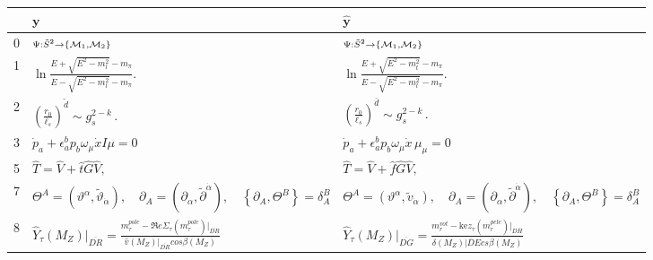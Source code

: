 \documentclass{article}
\begin{document}
\begin{figure*}
	\begin{tabular}{lll}
		& $\boldsymbol{y}$ & $\boldsymbol{\hat{y}}$ \\
		\hline
		\scriptsize{0} & $\scriptstyle{\Psi : \tilde { S } ^ { 2 } \to \{ { \cal M } _ { 1 } , { \cal M } _ { 2 } \} \, }$ & $\scriptstyle{\Psi : \tilde { S } ^ { 2 } \rightarrow \{ { \cal M } _ { 1 } , { \cal M } _ { 2 } \} }$ \\
\scriptsize{1} & $\scriptstyle{\operatorname { l n } { \frac { E + \sqrt { E ^ { 2 } - m _ { l } ^ { 2 } } - m _ { \pi } } { E - \sqrt { E ^ { 2 } - m _ { l } ^ { 2 } } - m _ { \pi } } } . }$ & $\scriptstyle{\operatorname { l n } { \frac { E + \sqrt { E ^ { 2 } - m _ { t } ^ { 2 } } - m _ { \pi } } { E - \sqrt { E ^ { 2 } - m _ { l } ^ { 2 } } - m _ { \pi } } } . }$ \\
\scriptsize{2} & $\scriptstyle{\left( { \frac { r _ { 0 } } { \ell _ { s } } } \right) ^ { \tilde { d } } \sim g _ { s } ^ { 2 - k } \, . }$ & $\scriptstyle{\left( \frac { r _ { 0 } } { \ell _ { s } } \right) ^ { \bar { d } } \sim g _ { s } ^ { 2 - k } \, . }$ \\
\scriptsize{3} & $\scriptstyle{\dot { p } _ { a } + \epsilon _ { a } ^ { b } p _ { b } \omega _ { \mu } \dot { x } I \mu = 0 }$ & $\scriptstyle{\dot { p } _ { a } + \epsilon _ { a } ^ { b } p _ { b } \omega _ { \mu } \dot { x } \, \mu _ { \mu } = 0 }$ \\
\scriptsize{5} & $\scriptstyle{{ \hat { T } } = { \hat { V } } + { \hat { t } } \hat { G } { \hat { V } } , }$ & $\scriptstyle{\hat { T } = \hat { V } + \hat { f } \hat { G } \hat { V } , }$ \\
\scriptsize{7} & $\scriptstyle{\Theta ^ { A } = \left( \vartheta ^ { \alpha } , \widetilde { \vartheta } _ { \dot { \alpha } } \right) , \quad \partial _ { A } = \left( \partial _ { \alpha } , \widetilde { \partial } ^ { \dot { \alpha } } \right) , \quad \left\{ \partial _ { A } , \Theta ^ { B } \right\} = \delta _ { A } ^ { B } }$ & $\scriptstyle{\Theta ^ { A } = \left( \vartheta ^ { \alpha } , \widetilde { v } _ { \dot { \alpha } } \right) , \quad \partial _ { A } = \left( \partial _ { \alpha } , \widetilde { \partial } ^ { \dot { \alpha } } \right) , \quad \left\{ \partial _ { A } , \Theta ^ { B } \right\} = \delta _ { A } ^ { B } }$ \\
\scriptsize{8} & $\scriptstyle{\hat { Y } _ { \tau } ( M _ { Z } ) | _ { \overline { { D R } } } = \frac { m _ { \tau } ^ { p o l e } - \Re e \Sigma _ { \tau } ( m _ { \tau } ^ { p o l e } ) | _ { \overline { { D R } } } } { \hat { v } ( M _ { Z } ) | _ { \overline { { D R } } } c o s \beta ( M _ { Z } ) } }$ & $\scriptstyle{\hat { Y } _ { \tau } ( M _ { Z } ) | _ { \overline { { D G } } } = \frac { m _ { r } ^ { v o t } - \mathrm { k e } z _ { \tau } ( m _ { r } ^ { p e l e } ) | _ { D \overline { { H } } } } { \delta ( M _ { Z } ) | \overline { { D } } E c s \beta ( M _ { Z } ) } }$ \\

\end{tabular}
\end{figure*}
\end{document}
